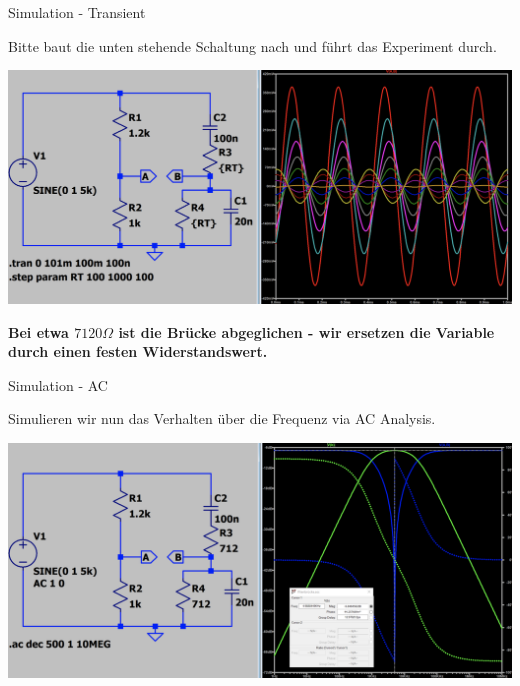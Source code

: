 \begin{frame}[t]{Simulation - Transient}

  Bitte baut die unten stehende Schaltung nach und führt das Experiment durch.

  \begin{spacing}{0.9} \begin{tiny}
      \begin{minipage}{\textwidth}
        \includegraphics[width=0.75\linewidth]{pictures/wheatstone_simulation.png}
      \end{minipage}
    \end{tiny} \end{spacing}

  \textbf{Bei etwa $7120\Omega$ ist die Brücke abgeglichen - wir ersetzen die Variable durch einen festen Widerstandswert.}

\end{frame}

\begin{frame}[t]{Simulation - AC}

  Simulieren wir nun das Verhalten über die Frequenz via AC Analysis.

  \begin{spacing}{0.9} \begin{tiny}
      \begin{minipage}{\textwidth}
        \includegraphics[width=0.75\linewidth]{pictures/wheatstone_ac.png}
      \end{minipage}
    \end{tiny} \end{spacing}

\end{frame}

